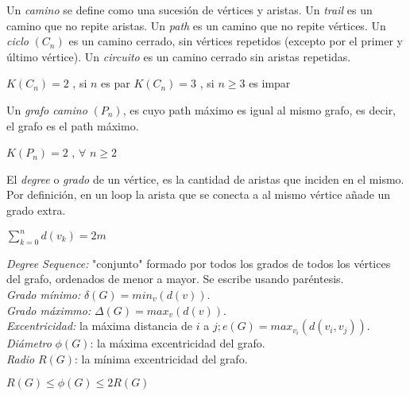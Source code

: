 \documentclass[titlepage,a4paper,12pt,twoside]{article}
\begin{document}
Un \textit{camino} se define como una sucesión de vértices y aristas. Un \textit{trail} es un camino que no repite aristas. Un \textit{path} es un camino que no repite vértices. Un \textit{ciclo} $(C_{n})$ es un camino cerrado, sin vértices repetidos (excepto por el primer y último vértice). Un \textit{circuito} es un camino cerrado sin aristas repetidas.

\begin{center}
$K(C_{n}) = 2 $ , si $n$ es par $K(C_{n}) = 3 $ , si $n \geqslant 3$ es impar
\end{center}

Un \textit{grafo camino} $(P_{n})$, es cuyo path máximo es igual al mismo grafo, es decir, el grafo es el path máximo.

\begin{center}
$K(P_{n}) = 2 $ , $\forall $ $n \geqslant 2$
\end{center}

El \textit{degree} o \textit{grado} de un vértice, es la cantidad de aristas que inciden en el mismo. Por definición, en un loop la arista que se conecta a al mismo vértice añade un grado extra.

\begin{center}
$\displaystyle \sum_{k=0}^{n} d(v_{k}) = 2m$\\
\end{center}

\textit{Degree Sequence:} "$ $conjunto" formado por todos los grados de todos los vértices del grafo, ordenados de menor a mayor. Se escribe usando paréntesis.\\

\textit{Grado mínimo:} $\delta (G) = min_{v}(d(v))$.\\

\textit{Grado máximmo:} $\Delta (G) = max_{v}(d(v))$.\\

\textit{Excentricidad:} la máxima distancia de $i$ a $j; e(G) = max_{v_{i}}(d(v_{i},v_{j}))$.\\

\textit{Diámetro} $\phi(G)$: la máxima excentricidad del grafo.\\

\textit{Radio} $R(G)$: la mínima excentricidad del grafo.

\begin{center}
$R(G) \leqslant \phi(G) \leqslant 2R(G)$\\
\end{center}
\end{document}
